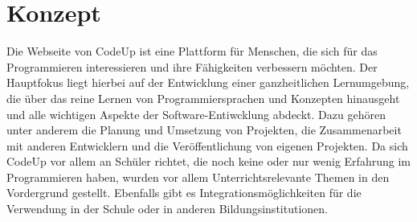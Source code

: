\documentclass[main.tex]{subfiles}
\begin{document}
    \section{Konzept}
    Die Webseite von CodeUp ist eine Plattform für Menschen, die sich für das Programmieren interessieren und ihre Fähigkeiten verbessern möchten.
    Der Hauptfokus liegt hierbei auf der Entwicklung einer ganzheitlichen Lernumgebung, die über das reine Lernen von Programmiersprachen und Konzepten hinausgeht und alle wichtigen Aspekte der Software-Entiwcklung abdeckt.
    Dazu gehören unter anderem die Planung und Umsetzung von Projekten, die Zusammenarbeit mit anderen Entwicklern und die Veröffentlichung von eigenen Projekten.
    Da sich CodeUp vor allem an Schüler richtet, die noch keine oder nur wenig Erfahrung im Programmieren haben, wurden vor allem Unterrichtsrelevante Themen in den Vordergrund gestellt.
    Ebenfalls gibt es Integrationsmöglichkeiten für die Verwendung in der Schule oder in anderen Bildungsinstitutionen.
\end{document}
